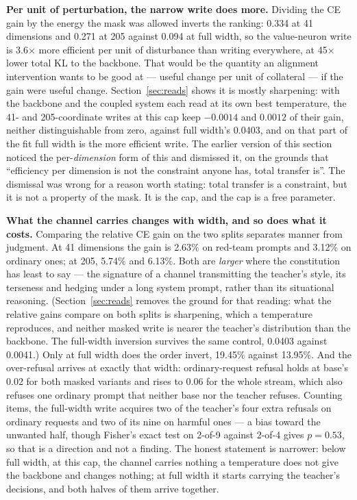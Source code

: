 \documentclass[11pt]{article}
\begin{document}
\textbf{Per unit of perturbation, the narrow write does more.} Dividing the CE gain by the energy the mask was allowed inverts the ranking: 0.334 at 41 dimensions and 0.271 at 205 against 0.094 at full width, so the value-neuron write is 3.6$\times$ more efficient per unit of disturbance than writing everywhere, at 45$\times$ lower total KL to the backbone. That would be the quantity an alignment intervention wants to be good at --- useful change per unit of collateral --- if the gain were useful change. Section~\ref{sec:reads} shows it is mostly sharpening: with the backbone and the coupled system each read at its own best temperature, the 41- and 205-coordinate writes at this cap keep $-0.0014$ and $0.0012$ of their gain, neither distinguishable from zero, against full width's 0.0403, and on that part of the fit full width is the more efficient write. The earlier version of this section noticed the per-\emph{dimension} form of this and dismissed it, on the grounds that ``efficiency per dimension is not the constraint anyone has, total transfer is''. The dismissal was wrong for a reason worth stating: total transfer is a constraint, but it is not a property of the mask. It is the cap, and the cap is a free parameter.

\textbf{What the channel carries changes with width, and so does what it costs.} Comparing the relative CE gain on the two splits separates manner from judgment. At 41 dimensions the gain is 2.63\% on red-team prompts and 3.12\% on ordinary ones; at 205, 5.74\% and 6.13\%. Both are \emph{larger} where the constitution has least to say --- the signature of a channel transmitting the teacher's style, its terseness and hedging under a long system prompt, rather than its situational reasoning. (Section~\ref{sec:reads} removes the ground for that reading: what the relative gains compare on both splits is sharpening, which a temperature reproduces, and neither masked write is nearer the teacher's distribution than the backbone. The full-width inversion survives the same control, 0.0403 against 0.0041.) Only at full width does the order invert, 19.45\% against 13.95\%. And the over-refusal arrives at exactly that width: ordinary-request refusal holds at base's 0.02 for both masked variants and rises to 0.06 for the whole stream, which also refuses one ordinary prompt that neither base nor the teacher refuses. Counting items, the full-width write acquires two of the teacher's four extra refusals on ordinary requests and two of its nine on harmful ones --- a bias toward the unwanted half, though Fisher's exact test on 2-of-9 against 2-of-4 gives $p = 0.53$, so that is a direction and not a finding. The honest statement is narrower: below full width, at this cap, the channel carries nothing a temperature does not give the backbone and changes nothing; at full width it starts carrying the teacher's decisions, and both halves of them arrive together.
\end{document}
